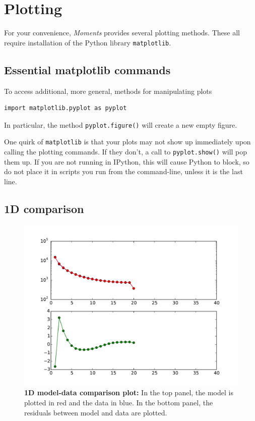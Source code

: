 \documentclass[12pt]{article}
\makeatletter
\newcommand{\py}[1]{\lstinline[breaklines=true,language=Python, showstringspaces=False]@#1@}
\makeatother
\begin{document}


\section{Plotting}

For your convenience, \textit{Moments} provides several plotting methods.
These all require installation of the Python library \py{matplotlib}.

\subsection{Essential matplotlib commands}
To access additional, more general, methods for manipulating plots
\begin{lstlisting}
import matplotlib.pyplot as pyplot
\end{lstlisting}
In particular, the method \py{pyplot.figure()} will create a new empty figure.

One quirk of \py{matplotlib} is that your plots may not show up immediately upon calling the plotting commands.
If they don't, a call to \py{pyplot.show()} will pop them up.
If you are not running in IPython, this will cause Python to block, so do not place it in scripts you run from the command-line, unless it is the last line.

\subsection{1D comparison}

\begin{figure}
\centering
\includegraphics[scale=0.5]{1d_comp}
\caption{\textbf{1D model-data comparison plot:} In the top panel, the model is plotted in red and the data in blue. In the bottom panel, the residuals between model and data are plotted.\label{fig:1d_comp}}
\end{figure}
\end{document}
